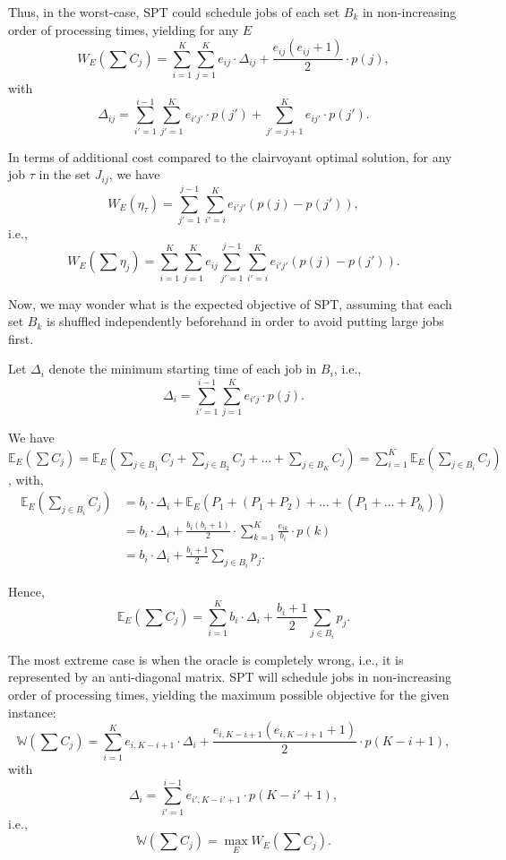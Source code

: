 \documentclass{article}
\begin{document}
Thus, in the worst-case, SPT could schedule jobs of each set \(B_k\) in non-increasing order of processing times, yielding for any \(E\)
\[
    W_E\left(\sum C_j\right)=\sum_{i=1}^{K} \sum_{j=1}^{K} e_{ij} \cdot \Delta_{ij} + \frac{e_{ij}(e_{ij}+1)}{2} \cdot p(j),
\]
with
\[
    \Delta_{ij}=\sum_{i'=1}^{i-1} \sum_{j'=1}^{K} e_{i'j'} \cdot p(j') + \sum_{j'=j+1}^{K} e_{ij'} \cdot p(j').
\]

In terms of additional cost compared to the clairvoyant optimal solution, for any job \(\tau\) in the set \(J_{ij}\), we have
\[
    W_E\left(\eta_{\tau}\right)=\sum_{j'=1}^{j-1}\sum_{i'=i}^K e_{i'j'}(p(j)-p(j')),
\]
i.e.,
\[
    W_E\left(\sum\eta_j\right)=\sum_{i=1}^K \sum_{j=1}^K e_{ij} \sum_{j'=1}^{j-1}\sum_{i'=i}^K e_{i'j'}(p(j)-p(j')).
\]

Now, we may wonder what is the expected objective of SPT, assuming that each set \(B_k\) is shuffled independently beforehand in order to avoid putting large jobs first.

Let \(\Delta_i\) denote the minimum starting time of each job in \(B_i\), i.e.,
\[
    \Delta_i=\sum_{i'=1}^{i-1} \sum_{j=1}^{K} e_{i'j} \cdot p(j).
\]

We have \(\mathbb{E}_E(\sum C_j)=\mathbb{E}_E(\sum_{j\in B_1} C_j + \sum_{j\in B_2} C_j + \dots + \sum_{j\in B_K} C_j)=\sum_{i=1}^{K} \mathbb{E}_E(\sum_{j\in B_i} C_j)\), with,
\begin{align*}
    \mathbb{E}_E\left(\sum_{j\in B_i} C_j\right)
    &=b_i \cdot \Delta_i + \mathbb{E}_E(P_1+(P_1+P_2)+\dots+(P_1+\dots+P_{b_i})) \\
    &=b_i \cdot \Delta_i + \frac{b_i(b_i+1)}{2} \cdot \sum_{k=1}^{K} \frac{e_{ik}}{b_i} \cdot p(k) \\
    &=b_i \cdot \Delta_i + \frac{b_i+1}{2} \sum_{j\in B_i} p_j.
\end{align*}

Hence,
\[
    \mathbb{E}_E\left(\sum C_j\right)=\sum_{i=1}^{K} b_i \cdot \Delta_i + \frac{b_i+1}{2} \sum_{j\in B_i} p_j.
\]

The most extreme case is when the oracle is completely wrong, i.e., it is represented by an anti-diagonal matrix.
SPT will schedule jobs in non-increasing order of processing times, yielding the maximum possible objective for the given instance:
\[
    \mathbb{W}\left(\sum C_j\right)=\sum_{i=1}^K e_{i,K-i+1}\cdot\Delta_{i}+\frac{e_{i,K-i+1}(e_{i,K-i+1}+1)}{2}\cdot p(K-i+1),
\]
with
\[
    \Delta_{i}=\sum_{i'=1}^{i-1} e_{i',K-i'+1}\cdot p(K-i'+1),
\]
i.e.,
\[
    \mathbb{W}\left(\sum C_j\right)=\max_E W_E\left(\sum C_j\right).
\]
\end{document}
